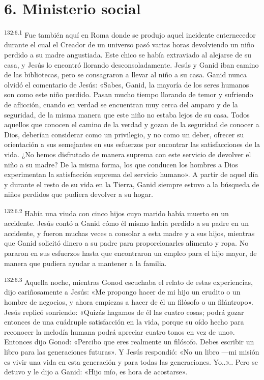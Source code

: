 \section*{6. Ministerio social}
\par 
\textsuperscript{132:6.1} Fue también aquí en Roma donde se produjo aquel incidente enternecedor durante el cual el Creador de un universo pasó varias horas devolviendo un niño perdido a su madre angustiada. Este chico se había extraviado al alejarse de su casa, y Jesús lo encontró llorando desconsoladamente. Jesús y Ganid iban camino de las bibliotecas, pero se consagraron a llevar al niño a su casa. Ganid nunca olvidó el comentario de Jesús: «Sabes, Ganid, la mayoría de los seres humanos son como este niño perdido. Pasan mucho tiempo llorando de temor y sufriendo de aflicción, cuando en verdad se encuentran muy cerca del amparo y de la seguridad, de la misma manera que este niño no estaba lejos de su casa. Todos aquellos que conocen el camino de la verdad y gozan de la seguridad de conocer a Dios, deberían considerar como un privilegio, y no como un deber, ofrecer su orientación a sus semejantes en sus esfuerzos por encontrar las satisfacciones de la vida. ¿No hemos disfrutado de manera suprema con este servicio de devolver el niño a su madre? De la misma forma, los que conducen los hombres a Dios experimentan la satisfacción suprema del servicio humano». A partir de aquel día y durante el resto de su vida en la Tierra, Ganid siempre estuvo a la búsqueda de niños perdidos que pudiera devolver a su hogar.

\par 
\textsuperscript{132:6.2} Había una viuda con cinco hijos cuyo marido había muerto en un accidente. Jesús contó a Ganid cómo él mismo había perdido a su padre en un accidente, y fueron muchas veces a consolar a esta madre y a sus hijos, mientras que Ganid solicitó dinero a su padre para proporcionarles alimento y ropa. No pararon en sus esfuerzos hasta que encontraron un empleo para el hijo mayor, de manera que pudiera ayudar a mantener a la familia.

\par 
\textsuperscript{132:6.3} Aquella noche, mientras Gonod escuchaba el relato de estas experiencias, dijo cariñosamente a Jesús: «Me propongo hacer de mi hijo un erudito o un hombre de negocios, y ahora empiezas a hacer de él un filósofo o un filántropo». Jesús replicó sonriendo: «Quizás hagamos de él las cuatro cosas; podrá gozar entonces de una cuádruple satisfacción en la vida, porque su oído hecho para reconocer la melodía humana podrá apreciar cuatro tonos en vez de uno». Entonces dijo Gonod: «Percibo que eres realmente un filósofo. Debes escribir un libro para las generaciones futuras». Y Jesús respondió: «No un libro ---mi misión es vivir una vida en esta generación y para todas las generaciones. Yo..».. Pero se detuvo y le dijo a Ganid: «Hijo mío, es hora de acostarse».

